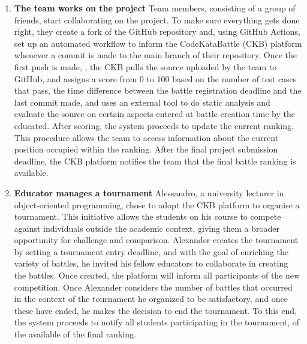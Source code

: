 \begin{enumerate}
    \item \textbf{The team works on the project}
    \newline
    Team members, consisting of a group of friends, start collaborating on the project. To make sure everything gets done right, they create a fork of the GitHub repository and, using GitHub Actions, set up an automated workflow to inform the CodeKataBattle (CKB) platform whenever a commit is made to the main branch of their repository.
    \newline
    Once the first push is made, , the CKB pulls the source uploaded by the team to GitHub, and assigns a score from 0 to 100 based on the number of test cases that pass, the time difference between the battle registration deadline and the last commit made, and uses an external tool to do static analysis and evaluate the source on certain aspects entered at battle creation time by the educated.
    \newline
    After scoring, the system proceeds to update the current ranking. This procedure allows the team to access information about the current position occupied within the ranking.
    \newline
    After the final project submission deadline, the CKB platform notifies the team that the final battle ranking is available.


    \item \textbf{Educator manages a tournament}
    \newline
    Alessandro, a university lecturer in object-oriented programming, chose to adopt the CKB platform to organise a tournament. This initiative allows the students on his course to compete against individuals outside the academic context, giving them a broader opportunity for challenge and comparison.
    \newline
    Alexander creates the tournament by setting a tournament entry deadline, and with the goal of enriching the variety of battles, he invited his fellow educators to collaborate in creating the battles. Once created, the platform will inform all participants of the new competition.
    \newline
    Once Alexander considers the number of battles that occurred in the context of the tournament he organized to be satisfactory, and once these have ended, he makes the decision to end the tournament. To this end, the system proceeds to notify all students participating in the tournament, of the available of the final ranking.





\end{enumerate}
